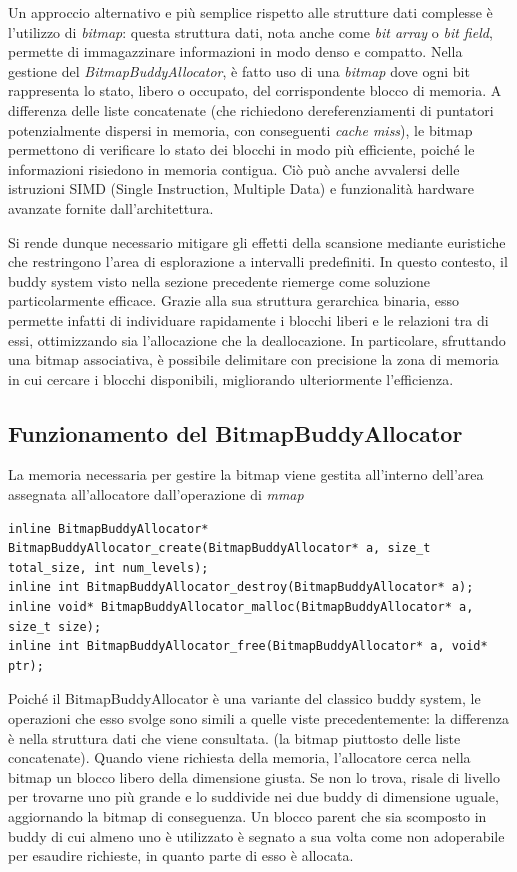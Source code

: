 Un approccio alternativo e più semplice rispetto alle strutture dati complesse è l’utilizzo di \textit{bitmap}: questa struttura dati, nota anche come \textit{bit array} o \textit{bit field}, permette di immagazzinare informazioni in modo denso e compatto.  Nella gestione del \textit{BitmapBuddyAllocator}, è fatto uso di una \textit{bitmap} dove ogni bit rappresenta lo stato, libero o occupato, del corrispondente blocco di memoria. A differenza delle liste concatenate (che richiedono dereferenziamenti di puntatori potenzialmente dispersi in memoria, con conseguenti \textit{cache miss}), le bitmap permettono di verificare lo stato dei blocchi in modo più efficiente, poiché le informazioni risiedono in memoria contigua. Ciò può anche avvalersi delle istruzioni SIMD (Single Instruction, Multiple Data) e funzionalità hardware avanzate fornite dall’architettura.

Si rende dunque necessario mitigare gli effetti della scansione mediante euristiche che restringono l’area di esplorazione a intervalli predefiniti. In questo contesto, il buddy system visto nella sezione precedente riemerge come soluzione particolarmente efficace. Grazie alla sua struttura gerarchica binaria, esso permette infatti di individuare rapidamente i blocchi liberi e le relazioni tra di essi, ottimizzando sia l’allocazione che la deallocazione. In particolare, sfruttando una bitmap associativa, è possibile delimitare con precisione la zona di memoria in cui cercare i blocchi disponibili, migliorando ulteriormente l’efficienza.

\subsection*{Funzionamento del BitmapBuddyAllocator}
La memoria necessaria per gestire la bitmap viene gestita all'interno dell'area assegnata all'allocatore dall'operazione di \textit{mmap}

\begin{lstlisting}
inline BitmapBuddyAllocator* BitmapBuddyAllocator_create(BitmapBuddyAllocator* a, size_t total_size, int num_levels);
inline int BitmapBuddyAllocator_destroy(BitmapBuddyAllocator* a);
inline void* BitmapBuddyAllocator_malloc(BitmapBuddyAllocator* a, size_t size);
inline int BitmapBuddyAllocator_free(BitmapBuddyAllocator* a, void* ptr);
\end{lstlisting}

Poiché il BitmapBuddyAllocator è una variante del classico buddy system, le operazioni che esso svolge sono simili a quelle viste precedentemente: la differenza è nella struttura dati che viene consultata. (la bitmap piuttosto delle liste concatenate). Quando viene richiesta della memoria, l’allocatore cerca nella bitmap un blocco libero della dimensione giusta. Se non lo trova, risale di livello per trovarne uno più grande e lo suddivide nei due buddy di dimensione uguale, aggiornando la bitmap di conseguenza. Un blocco parent che sia scomposto in buddy di cui almeno uno è utilizzato è segnato a sua volta come non adoperabile per esaudire richieste, in quanto parte di esso è allocata.

